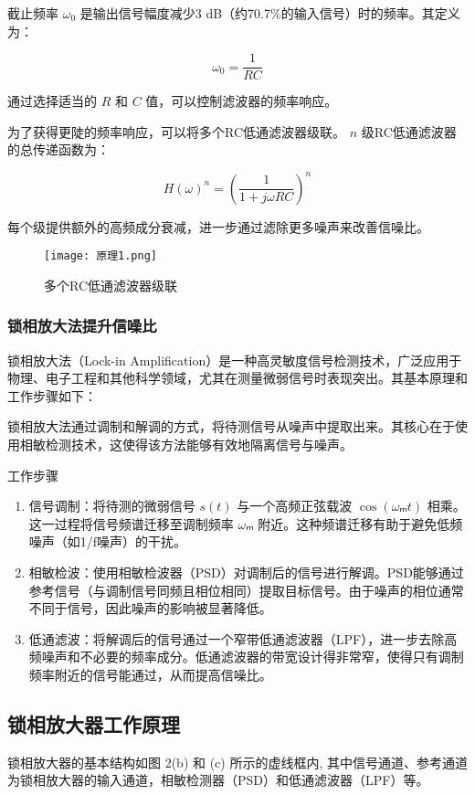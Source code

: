 \documentclass[dvipsnames, svgnames,a4paper,11pt]{article}
\begin{document}
截止频率 \( \omega_0 \) 是输出信号幅度减少3 dB（约70.7\%的输入信号）时的频率。其定义为：

\begin{equation}
\omega_0 = \frac{1}{RC}
\end{equation}

通过选择适当的 \( R \) 和 \( C \) 值，可以控制滤波器的频率响应。


为了获得更陡的频率响应，可以将多个RC低通滤波器级联。 \( n \) 级RC低通滤波器的总传递函数为：

\begin{equation}
H(\omega)^n = \left( \frac{1}{1 + j\omega RC} \right)^n
\end{equation}

每个级提供额外的高频成分衰减，进一步通过滤除更多噪声来改善信噪比。
\begin{figure}[{H}]
	\centering
	\texttt{[image: 原理1.png]}
	\caption{多个RC低通滤波器级联}
	\label{}
\end{figure}
\subsubsection{锁相放大法提升信噪比}
锁相放大法（Lock-in Amplification）是一种高灵敏度信号检测技术，广泛应用于物理、电子工程和其他科学领域，尤其在测量微弱信号时表现突出。其基本原理和工作步骤如下：

锁相放大法通过调制和解调的方式，将待测信号从噪声中提取出来。其核心在于使用相敏检测技术，这使得该方法能够有效地隔离信号与噪声。

工作步骤
\begin{enumerate}
	\item 信号调制：将待测的微弱信号 \( s(t) \) 与一个高频正弦载波 \( \cos(𝜔ₘ t) \) 相乘。这一过程将信号频谱迁移至调制频率 \( 𝜔ₘ \) 附近。这种频谱迁移有助于避免低频噪声（如1/f噪声）的干扰。
	\item 相敏检波：使用相敏检波器（PSD）对调制后的信号进行解调。PSD能够通过参考信号（与调制信号同频且相位相同）提取目标信号。由于噪声的相位通常不同于信号，因此噪声的影响被显著降低。
	\item 低通滤波：将解调后的信号通过一个窄带低通滤波器（LPF），进一步去除高频噪声和不必要的频率成分。低通滤波器的带宽设计得非常窄，使得只有调制频率附近的信号能通过，从而提高信噪比。
\end{enumerate}
\subsection{锁相放大器工作原理}
锁相放大器的基本结构如图 2(b) 和 (c) 所示的虚线框内, 其中信号通道、参考通道为锁相放大器的输入通道，相敏检测器（PSD）和低通滤波器（LPF）等。
\end{document}
